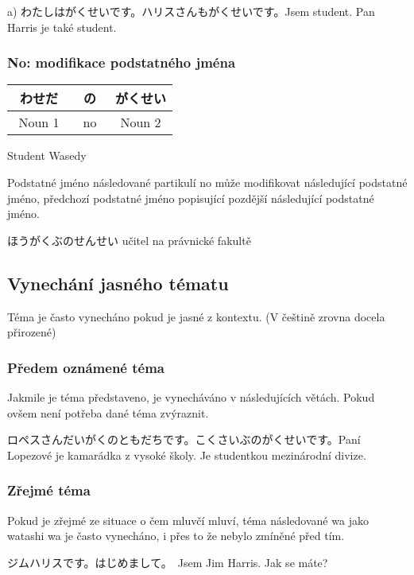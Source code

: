 a) わたしはがくせいです。ハリスさんもがくせいです。Jsem student. Pan Harris je také student.


\subsubsection{No: modifikace podstatného jména}
\begin{center}
\begin{tabular}{||c|c||c||}
\hline
わせだ　&の　&がくせい\\
\hline
Noun 1&no&Noun 2\\
\hline
\end{tabular}
\end{center}
Student Wasedy

Podstatné jméno následované partikulí no může modifikovat následující podstatné jméno, předchozí podstatné jméno popisující pozdější následující podstatné jméno. 


ほうがくぶのせんせい učitel na právnické fakultě

\subsection{Vynechání jasného tématu}
Téma je často vynecháno pokud je jasné z kontextu. (V češtině zrovna docela přirozené)

\subsubsection{Předem oznámené téma}
Jakmile je téma představeno, je vynecháváno v následujících větách. Pokud ovšem není potřeba dané téma zvýraznit.

ロペスさんだいがくのともだちです。こくさいぶのがくせいです。Paní Lopezové je kamarádka z vysoké školy. Je studentkou mezinárodní divize.

\subsubsection{Zřejmé téma}

Pokud je zřejmé ze situace o čem mluvčí mluví, téma následované wa jako watashi wa je často vynecháno, i přes to že nebylo zmíněné před tím.


ジムハリスです。はじめまして。　Jsem Jim Harris. Jak se máte?




























